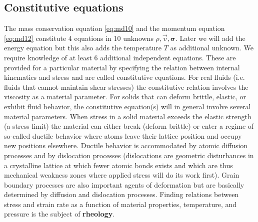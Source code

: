 \vspace{0.5cm}
\vspace{0.5cm}



\vspace{0.5cm}
\vspace{0.5cm}


\subsection{Constitutive equations}

The mass conservation equation \eqref{eq:md10} and the momentum equation \eqref{eq:md12} constitute 4
equations in 10 unknowns $\rho,\vec{v},{\bm \sigma}$. 
Later we will add the energy equation but this also
adds the temperature $T$ as additional unknown. We require knowledge of at least 6
additional independent equations. These are provided for a particular material by
specifying the relation between internal kinematics and stress and are called constitutive
equations. For real fluids (i.e. fluids that cannot maintain shear stresses) the constitutive
relation involves the viscosity as a material parameter. For solids that can deform brittle,
elastic, or exhibit fluid behavior, the constitutive equation(s) will in general involve
several material parameters. When stress in a solid material exceeds the elastic strength (a
stress limit) the material can either break (deform brittle) or enter a regime of so-called
ductile behavior where atoms leave their lattice position and occupy new positions
elsewhere. Ductile behavior is accommodated by atomic diffusion processes and by
dislocation processes (dislocations are geometric disturbances in a crystalline lattice at
which fewer atomic bonds exists and which are thus mechanical weakness zones where
applied stress will do its work first). Grain boundary processes are also important agents
of deformation but are basically determined by diffusion and dislocation processes.
Finding relations between stress and strain rate as a function of material properties,
temperature, and pressure is the subject of {\bf rheology}.

